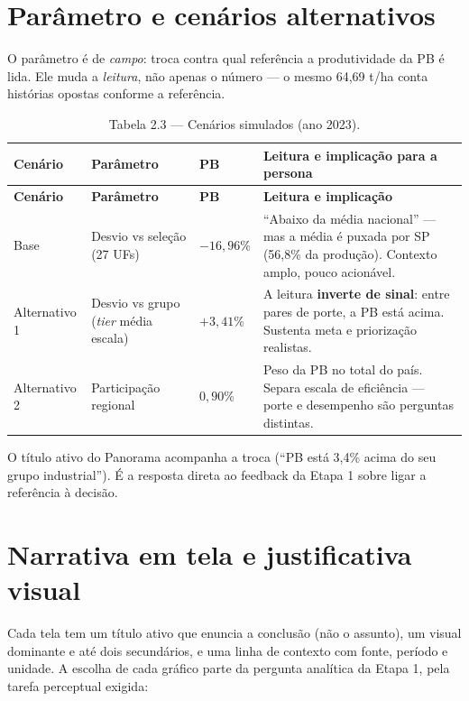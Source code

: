 \documentclass[11pt,a4paper]{article}
\begin{document}
\section{Parâmetro e cenários alternativos}\label{sec:cenarios}

O parâmetro é de \textit{campo}: troca contra qual referência a produtividade da PB é lida. Ele
muda a \textit{leitura}, não apenas o número — o mesmo 64,69 t/ha conta histórias opostas conforme
a referência.

\begin{longtable}{L{2.4cm} L{3.4cm} L{1.8cm} L{6.4cm}}
\caption{Tabela 2.3 — Cenários simulados (ano 2023).}\\
\toprule
\textbf{Cenário} & \textbf{Parâmetro} & \textbf{PB} & \textbf{Leitura e implicação para a persona}\\
\midrule
\endfirsthead
\toprule
\textbf{Cenário} & \textbf{Parâmetro} & \textbf{PB} & \textbf{Leitura e implicação}\\
\midrule
\endhead
\bottomrule
\endfoot
Base & Desvio vs seleção (27 UFs) & $-16{,}96\%$ & ``Abaixo da média nacional'' — mas a média é puxada por SP (56,8\% da produção). Contexto amplo, pouco acionável.\\
\addlinespace
Alternativo 1 & Desvio vs grupo (\textit{tier} média escala) & $+3{,}41\%$ & A leitura \textbf{inverte de sinal}: entre pares de porte, a PB está acima. Sustenta meta e priorização realistas.\\
\addlinespace
Alternativo 2 & Participação regional & $0{,}90\%$ & Peso da PB no total do país. Separa escala de eficiência — porte e desempenho são perguntas distintas.\\
\end{longtable}

O título ativo do Panorama acompanha a troca (``PB está 3,4\% acima do seu grupo industrial''). É
a resposta direta ao feedback da Etapa 1 sobre ligar a referência à decisão.

\section{Narrativa em tela e justificativa visual}

Cada tela tem um título ativo que enuncia a conclusão (não o assunto), um visual dominante e até
dois secundários, e uma linha de contexto com fonte, período e unidade. A escolha de cada gráfico
parte da pergunta analítica da Etapa 1, pela tarefa perceptual exigida:
\end{document}
